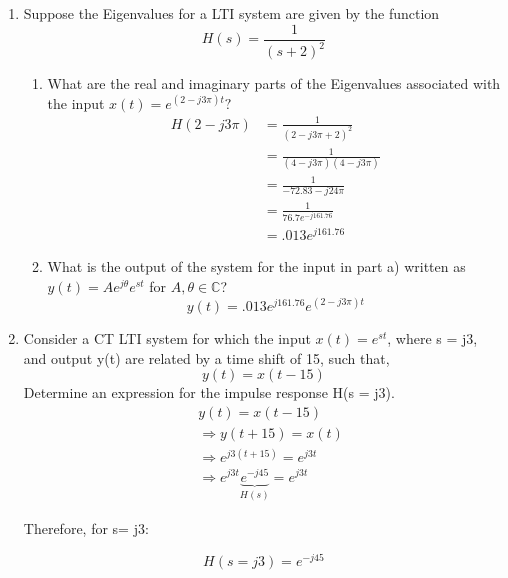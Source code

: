 \documentclass{article}
\begin{document}
\begin{enumerate}
    \item Suppose the Eigenvalues for a LTI system are given by the function
    \begin{equation}
        H(s) = \frac{1}{(s+2)^2}
    \end{equation}
    \begin{enumerate}
        \item What are the real and imaginary parts of the Eigenvalues associated with the input $x(t) = e^{(2-j3\pi)t}?$
        \begin{align}
            H(2-j3\pi) &= \frac{1}{(2-j3\pi+2)^2}\\
            &= \frac{1}{(4-j3\pi)(4-j3\pi)}\\
            &= \frac{1}{-72.83-j24\pi}\\
            &= \frac{1}{76.7e^{-j161.76}}\\
            &= \boxed{.013e^{j161.76}}
        \end{align}
        \item What is the output of the system for the input in part a) written as $y(t) = Ae^{j\theta}e^{st}$ for $A,\theta\in\mathbb{C}$?    
        \begin{equation}
            y(t) = \boxed{.013e^{j161.76}e^{(2-j3\pi)t}}
        \end{equation}
    \end{enumerate}
    \newpage
    \item Consider a CT LTI system for which the input $x(t) = e^{st}$, where s = j3, and output y(t)  are related by a time shift of 15, such that,
    \begin{equation}
        y(t) = x(t-15)
    \end{equation}
    Determine an expression for the impulse response H(s = j3).
        \begin{align}
        &y(t) = x(t-15)\\\
        &\Rightarrow y(t+15) = x(t)\\
        &\Rightarrow e^{j3(t+15)} = e^{j3t}\\
        &\Rightarrow e^{j3t}\underbrace{\boxed{e^{-j45}}}_{H(s)} = e^{j3t}
        \end{align}
    \begin{center}
        Therefore, for s= j3:
    \end{center}
    \begin{equation}
        H(s=j3) = \boxed{e^{-j45}}
    \end{equation}

\end{enumerate}
\end{document}
